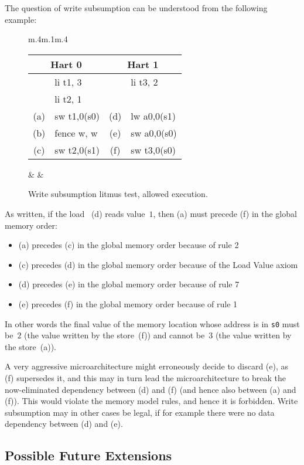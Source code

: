 The question of write subsumption can be understood from the following example:
\begin{figure}[h!]
  \centering
  \begin{tabular}{m{.4\linewidth}m{.1\linewidth}m{.4\linewidth}}
    \tt\small
    \begin{tabular}{cl||cl}
    \multicolumn{2}{c}{Hart 0} & \multicolumn{2}{c}{Hart 1} \\
    \hline
        & li t1, 3    &     & li  t3, 2    \\
        & li t2, 1    &     &              \\
    (a) & sw t1,0(s0) & (d) & lw  a0,0(s1) \\
    (b) & fence w, w  & (e) & sw  a0,0(s0) \\
    (c) & sw t2,0(s1) & (f) & sw  t3,0(s0) \\
    \end{tabular}
  & &
    
  \end{tabular}
  \caption{Write subsumption litmus test, allowed execution.}
  \label{fig:litmus:subsumption}
\end{figure}

As written, if the load ~(d) reads value~$1$, then (a) must precede (f) in the global memory order:
\begin{itemize}
  \item (a) precedes (c) in the global memory order because of rule 2
  \item (c) precedes (d) in the global memory order because of the Load Value axiom
  \item (d) precedes (e) in the global memory order because of rule 7
  \item (e) precedes (f) in the global memory order because of rule 1
\end{itemize}
In other words the final value of the memory location whose address is in {\tt s0} must be~$2$ (the value written by the store~(f)) and cannot be~$3$ (the value written by the store~(a)).

A very aggressive microarchitecture might erroneously decide to discard (e), as (f) supersedes it, and this may in turn lead the microarchitecture to break the now-eliminated dependency between (d) and (f) (and hence also between (a) and (f)).
This would violate the memory model rules, and hence it is forbidden.
Write subsumption may in other cases be legal, if for example there were no data dependency between (d) and (e).

\subsection{Possible Future Extensions}

